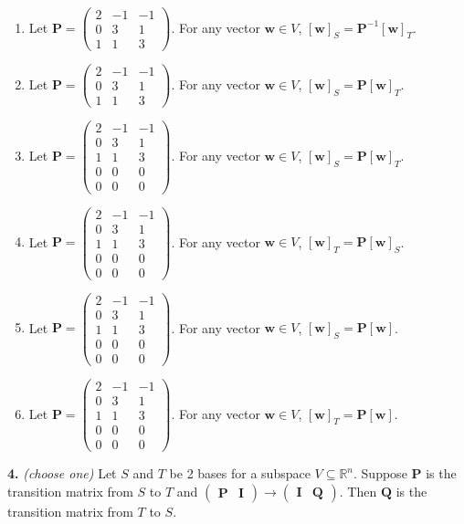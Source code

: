 \documentclass[10pt,a4paper]{article}
\begin{document}
\begin{enumerate}[label=(\Alph*)]
\item Let \(\mathbf{P}=\begin{pmatrix}2&-1&-1\\0&3&1\\1&1&3\end{pmatrix}\). For any vector \(\mathbf{w}\in V\), \([\mathbf{w}]_S=\mathbf{P}^{-1}[\mathbf{w}]_T\).
\item Let \(\mathbf{P}=\begin{pmatrix}2&-1&-1\\0&3&1\\1&1&3\end{pmatrix}\). For any vector \(\mathbf{w}\in V\), \([\mathbf{w}]_S=\mathbf{P}[\mathbf{w}]_T\).
\item Let \(\mathbf{P}=\begin{pmatrix}2&-1&-1\\0&3&1\\1&1&3\\0&0&0\\0&0&0\end{pmatrix}\). For any vector \(\mathbf{w}\in V\), \([\mathbf{w}]_S=\mathbf{P}[\mathbf{w}]_T\).
\item Let \(\mathbf{P}=\begin{pmatrix}2&-1&-1\\0&3&1\\1&1&3\\0&0&0\\0&0&0\end{pmatrix}\). For any vector \(\mathbf{w}\in V\), \([\mathbf{w}]_T=\mathbf{P}[\mathbf{w}]_S\).
\item Let \(\mathbf{P}=\begin{pmatrix}2&-1&-1\\0&3&1\\1&1&3\\0&0&0\\0&0&0\end{pmatrix}\). For any vector \(\mathbf{w}\in V\), \([\mathbf{w}]_S=\mathbf{P}[\mathbf{w}]\).
\item Let \(\mathbf{P}=\begin{pmatrix}2&-1&-1\\0&3&1\\1&1&3\\0&0&0\\0&0&0\end{pmatrix}\). For any vector \(\mathbf{w}\in V\), \([\mathbf{w}]_T=\mathbf{P}[\mathbf{w}]\).
\end{enumerate}
\smallskip
\textbf{4.} \textit{(choose one)} Let \(S\) and \(T\) be 2 bases for a subspace \(V\subseteq\mathbb{R}^n\). Suppose \(\mathbf{P}\) is the transition matrix from \(S\) to \(T\) and \( (\begin{array}{c|c} \mathbf{P} & \mathbf{I} \end{array}) \rightarrow ( \begin{array}{c|c}\mathbf{I}&\mathbf{Q} \end{array} ) \). Then \(\mathbf{Q}\) is the transition matrix from \(T\) to \(S\).
\end{document}
